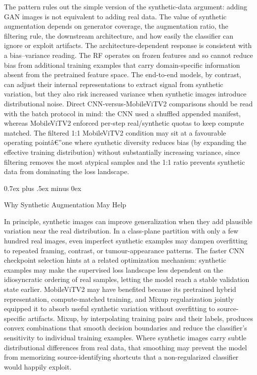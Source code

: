 \documentclass[conference,twoside]{IEEEtran}
\makeatletter
\newcommand{\bodyfont}{\rmfamily}
\def\subsection{\@startsection{subsection}{2}{\z@}{1.5ex plus 1.5ex minus 0.5ex}%
{0.7ex plus .5ex minus 0ex}{\normalfont\normalsize\bodyfont\bfseries\raggedright}}
\makeatother
\begin{document}
The pattern rules out the simple version of the synthetic-data argument: adding GAN images is not equivalent to adding real data. The value of synthetic augmentation depends on generator coverage, the augmentation ratio, the filtering rule, the downstream architecture, and how easily the classifier can ignore or exploit artifacts. The architecture-dependent response is consistent with a bias--variance reading. The RF operates on frozen features and so cannot reduce bias from additional training examples that carry domain-specific information absent from the pretrained feature space. The end-to-end models, by contrast, can adjust their internal representations to extract signal from synthetic variation, but they also risk increased variance when synthetic images introduce distributional noise. Direct CNN-versus-MobileViTV2 comparisons should be read with the batch protocol in mind: the CNN used a shuffled appended manifest, whereas MobileViTV2 enforced per-step real/synthetic quotas to keep compute matched. The filtered 1:1 MobileViTV2 condition may sit at a favourable operating pointâ€”one where synthetic diversity reduces bias (by expanding the effective training distribution) without substantially increasing variance, since filtering removes the most atypical samples and the 1:1 ratio prevents synthetic data from dominating the loss landscape.

\subsection{Why Synthetic Augmentation May Help}

In principle, synthetic images can improve generalization when they add plausible variation near the real distribution. In a class-plane partition with only a few hundred real images, even imperfect synthetic examples may dampen overfitting to repeated framing, contrast, or tumour-appearance patterns. The faster CNN checkpoint selection hints at a related optimization mechanism: synthetic examples may make the supervised loss landscape less dependent on the idiosyncratic ordering of real samples, letting the model reach a stable validation state earlier. MobileViTV2 may have benefited because its pretrained hybrid representation, compute-matched training, and Mixup regularization jointly equipped it to absorb useful synthetic variation without overfitting to source-specific artifacts. Mixup, by interpolating training pairs and their labels, produces convex combinations that smooth decision boundaries and reduce the classifier's sensitivity to individual training examples. Where synthetic images carry subtle distributional differences from real data, that smoothing may prevent the model from memorizing source-identifying shortcuts that a non-regularized classifier would happily exploit.
\end{document}
